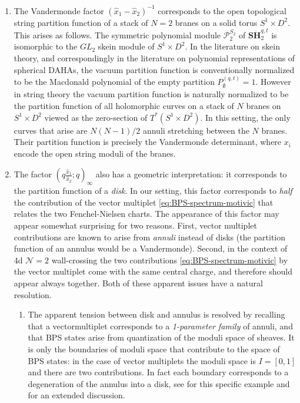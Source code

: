 \documentclass{article}
\numberwithin{equation}{section}
\newcommand{\xh}{\hat{x}}
\def\CN{{\mathcal{N}}}
\def\CP{{\mathcal{P}}}
\newcommand{\SH}{{\mathbf{S}\ddot{\mathbf{H}}}}
\begin{document}
\begin{enumerate}
\item
The Vandermonde factor $(\hat x_1-\hat x_2)^{-1}$ corresponds to the open topological string partition function of a stack of $N=2$ branes on a solid torus $S^1\times D^2$. This arises as follows. The symmetric polynomial module $\CP_2^{S_2}$ of $\SH_2^{q,t}$ is isomorphic to the $GL_2$ skein module of $S^1\times D^2$. 
In the literature on skein theory, and correspondingly in the literature on polynomial representations of spherical DAHAs, the vacuum partition function is conventionally normalized to be the Macdonald polynomial of the empty partition $P_{\emptyset}^{(q,t)} = 1$. However in string theory the vacuum partition function is naturally normalized to be the partition function of all holomorphic curves on a stack of $N$ branes on $S^1\times D^2$ viewed as the zero-section of $T^*(S^1\times D^2)$.
In this setting, the only curves that arise are $N(N-1)/2$ annuli stretching between the $N$ branes. Their partition function is precisely the Vandermonde determinant, where $x_i$ encode the open string moduli of the branes. 


\item
The factor $(q\frac{\xh_1}{\xh_2};q)_\infty$ also has a geometric interpretation: it corresponds to the partition function of a \emph{disk}. 
In our setting, this factor corresponds to \emph{half} the contribution of the vector multiplet \eqref{eq:BPS-spectrum-motivic} that relates the two Fenchel-Nielsen charts. 
The appearance of this factor may appear somewhat surprising for two reasons. First, vector multiplet contributions are known to arise from \textit{annuli} instead of disks \cite{Gaiotto:2009hg} (the partition function of an annulus would be a Vandermonde). Second, in the context of 4d $\CN=2$ wall-crossing the two contributions \eqref{eq:BPS-spectrum-motivic} by the vector multiplet come with the same central charge, and therefore should appear always together. 
Both of these apparent issues have a natural resolution. 
\begin{enumerate}
\item
The apparent tension between disk and annulus is resolved by recalling that a vectormultiplet corresponds to a \textit{1-parameter family} of annuli, and that BPS {states} arise from quantization of the moduli space of sheaves.
It is only the boundaries of moduli space that contribute to the space of BPS states: in the case of vector multiplets the moduli space is $I=[0,1]$ and there are two contributions.
In fact each boundary corresponds to a degeneration of the annulus into a disk, see \cite{Banerjee:2022oed} for this specific example and for an extended discussion.



\end{enumerate}
\end{enumerate}
\end{document}
